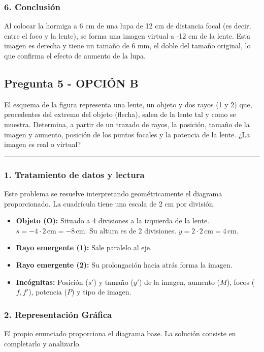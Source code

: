 \subsubsection*{6. Conclusión}
\begin{cajaconclusion}
Al colocar la hormiga a 6 cm de una lupa de 12 cm de distancia focal (es decir, entre el foco y la lente), se forma una imagen virtual a -12 cm de la lente. Esta imagen es derecha y tiene un tamaño de 6 mm, el doble del tamaño original, lo que confirma el efecto de aumento de la lupa.
\end{cajaconclusion}

\newpage

\subsection{Pregunta 5 - OPCIÓN B}
\label{subsec:5B_2019_jul_ext}
\begin{cajaenunciado}
El esquema de la figura representa una lente, un objeto y dos rayos (1 y 2) que, procedentes del extremo del objeto (flecha), salen de la lente tal y como se muestra. Determina, a partir de un trazado de rayos, la posición, tamaño de la imagen y aumento, posición de los puntos focales y la potencia de la lente. ¿La imagen es real o virtual?
\end{cajaenunciado}
\hrule

\subsubsection*{1. Tratamiento de datos y lectura}
Este problema se resuelve interpretando geométricamente el diagrama proporcionado. La cuadrícula tiene una escala de 2 cm por división.
\begin{itemize}
    \item \textbf{Objeto (O):} Situado a 4 divisiones a la izquierda de la lente. $s = -4 \cdot 2\,\text{cm} = -8\,\text{cm}$. Su altura es de 2 divisiones. $y = 2 \cdot 2\,\text{cm} = 4\,\text{cm}$.
    \item \textbf{Rayo emergente (1):} Sale paralelo al eje.
    \item \textbf{Rayo emergente (2):} Su prolongación hacia atrás forma la imagen.
    \item \textbf{Incógnitas:} Posición ($s'$) y tamaño ($y'$) de la imagen, aumento ($M$), focos ($f, f'$), potencia ($P$) y tipo de imagen.
\end{itemize}

\subsubsection*{2. Representación Gráfica}
El propio enunciado proporciona el diagrama base. La solución consiste en completarlo y analizarlo.

